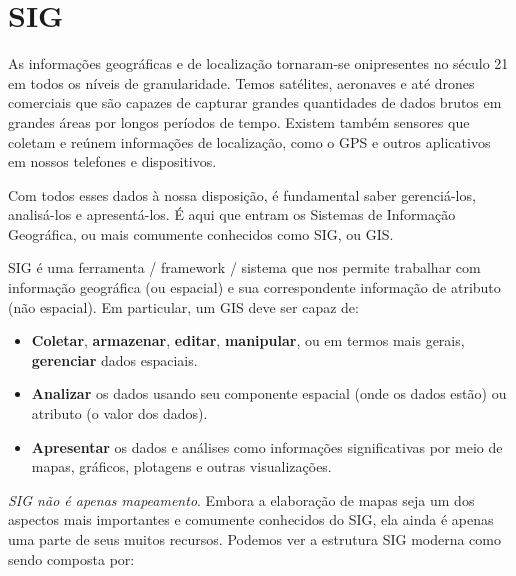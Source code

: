 \documentclass[
]{krantz}
\providecommand{\tightlist}{%
  \setlength{\itemsep}{0pt}\setlength{\parskip}{0pt}}
\begin{document}
\hypertarget{sig}{%
\section{SIG}\label{sig}}

As informações geográficas e de localização tornaram-se onipresentes no século 21 em todos os níveis de granularidade. Temos satélites, aeronaves e até drones comerciais que são capazes de capturar grandes quantidades de dados brutos em grandes áreas por longos períodos de tempo. Existem também sensores que coletam e reúnem informações de localização, como o GPS e outros aplicativos em nossos telefones e dispositivos.

Com todos esses dados à nossa disposição, é fundamental saber gerenciá-los, analisá-los e apresentá-los. É aqui que entram os Sistemas de Informação Geográfica, ou mais comumente conhecidos como SIG, ou GIS.

SIG é uma ferramenta / framework / sistema que nos permite trabalhar com informação geográfica (ou espacial) e sua correspondente informação de atributo (não espacial). Em particular, um GIS deve ser capaz de:

\begin{itemize}
\tightlist
\item
  \textbf{Coletar}, \textbf{armazenar}, \textbf{editar}, \textbf{manipular}, ou em termos mais gerais, \textbf{gerenciar} dados espaciais.
\item
  \textbf{Analizar} os dados usando seu componente espacial (onde os dados estão) ou atributo (o valor dos dados).
\item
  \textbf{Apresentar} os dados e análises como informações significativas por meio de mapas, gráficos, plotagens e outras visualizações.
\end{itemize}

\emph{SIG não é apenas mapeamento}. Embora a elaboração de mapas seja um dos aspectos mais importantes e comumente conhecidos do SIG, ela ainda é apenas uma parte de seus muitos recursos. Podemos ver a estrutura SIG moderna como sendo composta por:
\end{document}
